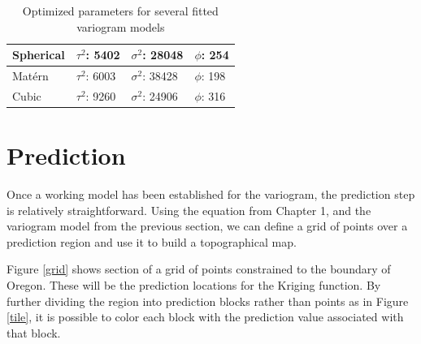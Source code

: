\documentclass[12pt,twoside]{reedthesis}
\begin{document}
	
	
	   
	  
	
	
\begin{table}[h]

\centering

\begin{tabular}{l|l|l|l}

\hline

 Spherical & $\tau^2$: 5402 & $\sigma^2$: 28048  & $\phi$: 254 \\
 
 \hline
 
 
Mat\'ern & $\tau^2$: 6003 & $\sigma^2$: 38428  & $\phi$: 198 \\

 \hline
 
 Cubic & $\tau^2$: 9260 & $\sigma^2$: 24906  & $\phi$: 316 \\
 \hline
 
 \end{tabular}
 
 \caption{Optimized parameters for several fitted variogram models}
 \label{param}
 
 \end{table}
 
 \section{Prediction}
 
 Once a working model has been established for the variogram, the prediction step is relatively straightforward. Using the equation from Chapter 1, and the variogram model from the previous section, we can define a grid of points over a prediction region and use it to build a topographical map. 
 
 Figure \ref{grid} shows section of a grid of points constrained to the boundary of Oregon. These will be the prediction locations for the Kriging function. By further dividing the region into prediction blocks rather than points as in Figure \ref{tile}, it is possible to color each block with the prediction value associated with that block. 
 
\end{document}

